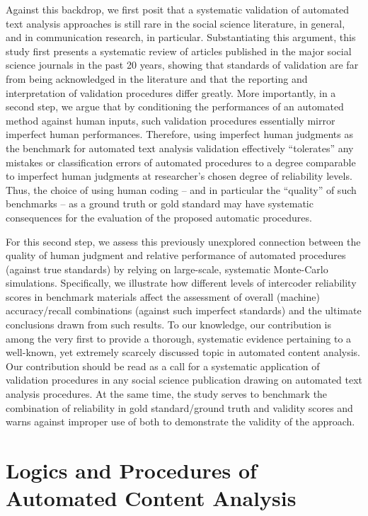 \documentclass[man, 12pt, a4paper, nolmodern, noextraspace]{apa6}
\begin{document}
    Against this backdrop, we first posit that a systematic validation of automated text analysis approaches is still rare in the social science literature, in general, and in communication research, in particular. Substantiating this argument, this study first presents a systematic review of articles published in the major social science journals in the past 20 years, showing that standards of validation are far from being acknowledged in the literature and that the reporting and interpretation of validation procedures differ greatly. More importantly, in a second step, we argue that by conditioning the performances of an automated method against human inputs, such validation procedures essentially mirror imperfect human performances. Therefore, using imperfect human judgments as the benchmark for automated text analysis validation effectively \enquote{tolerates} any mistakes or classification errors of automated procedures to a degree comparable to imperfect human judgments at researcher’s chosen degree of reliability levels. Thus, the choice of using human coding – and in particular the \enquote{quality} of such benchmarks – as a ground truth or gold standard may have systematic consequences for the evaluation of the proposed automatic procedures. 

    For this second step, we assess this previously unexplored connection between the quality of human judgment and relative performance of automated procedures (against true standards) by relying on large-scale, systematic Monte-Carlo simulations. Specifically, we illustrate how different levels of intercoder reliability scores in benchmark materials affect the assessment of overall (machine) accuracy/recall combinations (against such imperfect standards) and the ultimate conclusions drawn from such results. To our knowledge, our contribution is among the very first to provide a thorough, systematic evidence pertaining to a well-known, yet extremely scarcely discussed topic in automated content analysis. Our contribution should be read as a call for a systematic application of validation procedures in any social science publication drawing on automated text analysis procedures. At the same time, the study serves to benchmark the combination of reliability in gold standard/ground truth and validity scores and warns against improper use of both to demonstrate the validity of the approach. 
    
\section{Logics and Procedures of Automated Content Analysis}
\end{document}
